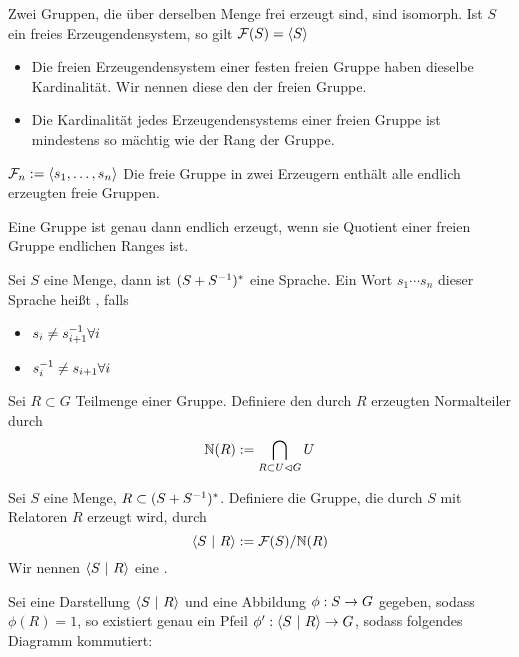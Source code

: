 \documentclass{article}
\newcommand{\normal}{\vartriangleleft}
\newcommand{\tm}{\subset}
\begin{document}
%
Zwei Gruppen, die über derselben Menge frei erzeugt sind, sind isomorph.
\Kor{}
Ist $S$ ein freies Erzeugendensystem, so gilt
$\F(S) = \grp{S}{}$

\begin{itemize}
\item Die freien Erzeugendensystem einer festen freien Gruppe haben dieselbe Kardinalität. Wir nennen diese den  der freien Gruppe.
\item Die Kardinalität jedes Erzeugendensystems einer freien Gruppe ist mindestens so mächtig wie der Rang der Gruppe. 
\end{itemize}

$\F_n := \grp{s_1, \ldots, s_n}{}$
Die freie Gruppe in zwei Erzeugern enthält alle endlich erzeugten freie Gruppen.

\Satz{}
Eine Gruppe ist genau dann endlich erzeugt, wenn sie Quotient einer freien Gruppe endlichen Ranges ist.

Sei $S$ eine Menge, dann ist $(S + S^{-1})^*$ eine Sprache. Ein Wort $s_1\cdots s_n$ dieser Sprache heißt , falls
\begin{itemize}
\item $s_i \neq s_{i+1}^{-1} \forall i$
\item $s_i^{-1} \neq s_{i+1} \forall i$
\end{itemize}

Sei $R \tm G$ Teilmenge einer Gruppe. Definiere den durch $R$ erzeugten Normalteiler durch
\[\N(R) := \bigcap_{R \tm U \normal G} U \] 

Sei $S$ eine Menge, $R \subset (S + S^{-1})^*$. Definiere die Gruppe, die durch $S$ mit Relatoren $R$ erzeugt wird, durch
\[ \grp{S}{R} := \F(S) / \N(R) \]
Wir nennen $\grp{S}{R}$ eine .

Sei eine Darstellung $\grp{S}{R}$ und eine Abbildung $\phi : S \overset{}{\rightarrow} G$ gegeben, sodass $\phi(R) = 1$, so existiert genau ein Pfeil $\phi' :\grp{S}{R} \pfeil{} G$, sodass folgendes Diagramm kommutiert:
\begin{center}
\end{center}
\end{document}
